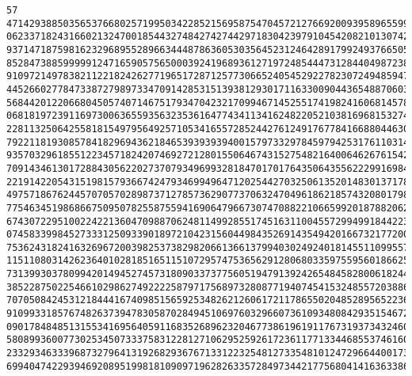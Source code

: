 \documentclass{article}
\begin{document}
\begin{verbatim}
57 471429388503565376680257199503422852156958754704572127669200939589655990142916822114748039302
062337182431660213247001854432748427427442971830423979104542082101307422605191056510324506648566
937147187598162329689552896634448786360530356452312464289179924937665058720299895440658944181666
852847388599999124716590575650003924196893612719724854447312844049872388031152104285729451089081
910972149783821122182426277196517287125773066524054529227823072494859470452159827847903965557261
445266027784733872798973347091428531513938129301711633009044365488706030065490055157090746828433
568442012206680450574071467517934704232170994671452551741982416068145783512607693595710537558881
068181972391169730063655935632353616477434113416248220521038169681532741224342802008888249548756
228113250642558181549795649257105341655728524427612491767784166880446309420409662719637234302459
792211819308578418296943621846539393939400157973329784597942531761103148739942282618888012289992
935703296185512234571824207469272128015506467431527548216400646267615425825571384526519700092537
709143461301728843056220273707934969932818470170176435064355622299169841070839519382865770122732
221914220543151981579366742479346994964712025442703250613520148301371782450824457172532601775604
497571867624457070570289873712785736290773706324704961862185743208017980465108467086205021395602
775463451986866750950782558755941690647966730747088221066599201878820622476095875601747811706413
674307229510022422136047098870624811499285517451631100455729949918442232166636212030420752941950
074583399845273331250933901897210423156044984352691435494201667321772003702285272736062186171719
753624318241632696720039825373829820661366137994030249240181455110995577204923053037480993278108
115110803142623640102818516511510729574753656291280680335975595601866258779420547043861753594995
731399303780994201494527457318090337377560519479139242654845828006182444733339571739602222433117
385228750225466102986274922225879717568973280877194074541532485572038864218286434538890901923559
707050842453121844416740985156592534826212606172117865502048528956522367688868522095065355234149
910993318576748263739478305870284945106976032966073610934808429351546723532884196993547396501683
090178484851315534169564059116835268962320467738619619117673193734324602177558744816075876043617
580899360077302534507333758312281271062952592617236117713344685537461607395483759500468319237650
233293463339687327964131926829367671331223254812733548101247296644001733677813254886568595814387
699404742293946920895199818109097196282633572849734421775680414163633868915167255929528921680775

\end{verbatim}
\end{document}
